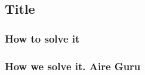 \subsection{Title}
\begin{comment}
    --relevante de manera general vs relevante personal
    --casos personales
    --aplicabilidad
    --solventar problema en particular
    
    
    
    \begin{itemize}
    
          \item Herramientas necesarias para que el usuario entienda la informacion y de porque
     \item conocimientos multidisciplinares
        \item fuentes fiables, actualizacion periodica
    \end{itemize}
    \end{comment}

\subsubsection{How to solve it} 


\subsubsection{How we solve it. Aire Guru} 
 
\begin{itemize}
    \done
    \crossed
    
\end{itemize}
 \newpage